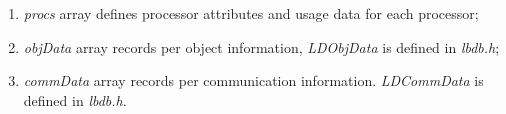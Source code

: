 \begin{enumerate}
\item {\em procs} array defines processor attributes and usage data for each
processor;
\item {\em objData} array records per object information, {\em LDObjData} is defined in {\em lbdb.h};
\item {\em commData} array records per communication information. {\em LDCommData} is defined in {\em lbdb.h}.
\end{enumerate}

